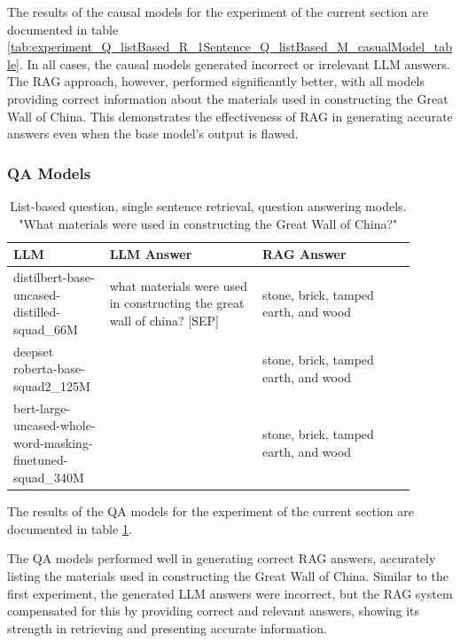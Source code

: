\documentclass{wseas}
\begin{document}
The results of the causal models for the experiment of the current section 
are documented in table \ref{tab:experiment_Q_listBased_R_1Sentence_Q_listBased_M_casualModel_table}.
In all cases, the causal models generated incorrect or irrelevant LLM
answers. The RAG approach, however, performed significantly better, with
all models providing correct information about the materials used in
constructing the Great Wall of China. This demonstrates the
effectiveness of RAG in generating accurate answers even when the base
model's output is flawed.

\subsubsection{QA Models}


\begin{table}[htbp]
  \centering
  \caption{List-based question, single sentence retrieval, question answering models. "What materials were used in constructing the Great Wall of China?"} %
  \label{tab:experiment_Q_listBased_R_1Sentence_Q_listBased_M_QaModels_table} 
  \begin{tabular}{|p{0.20\linewidth}|p{0.35\linewidth}|p{0.35\linewidth}|}
    \hline
    \textbf{LLM} & \textbf{LLM Answer} & \textbf{RAG Answer} \\ \hline
    distilbert-base-uncased-distilled-squad\_66M & what materials were used in constructing the great wall of china? {[}SEP{]} & stone, brick, tamped earth, and wood \\ \hline
    deepset roberta-base-squad2\_125M & & stone, brick, tamped earth, and wood \\ \hline
    bert-large-uncased-whole-word-masking-finetuned-squad\_340M & & stone, brick, tamped earth, and wood \\ \hline
  \end{tabular}
\end{table}


The results of the QA models for the experiment of the current section 
are documented in table \ref{tab:experiment_Q_listBased_R_1Sentence_Q_listBased_M_QaModels_table}.

The QA models performed well in generating correct RAG answers,
accurately listing the materials used in constructing the Great Wall of
China. Similar to the first experiment, the generated LLM answers were
incorrect, but the RAG system compensated for this by providing correct
and relevant answers, showing its strength in retrieving and presenting
accurate information.
\end{document}
